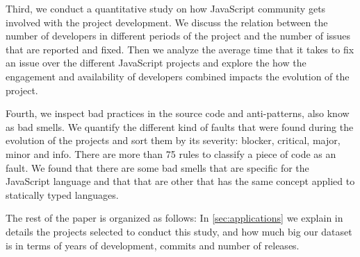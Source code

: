 Third, we conduct a quantitative study on how JavaScript community gets involved with the project development. We discuss the relation between the number of developers in different periods of the project and the number of issues that are reported and fixed. Then we analyze the average time that it takes to fix an issue over the different JavaScript projects and explore the how the engagement and availability of developers combined impacts the evolution of the project. 

Fourth, we inspect bad practices in the source code and anti-patterns, also know as bad smells. We quantify the different kind of faults that were found during the evolution of the projects and sort them by its severity: blocker, critical, major, minor and info. There are more than 75 rules to classify a piece of code as an fault. We found that there are some bad smells that are specific for the JavaScript language and that that are other that has the same concept applied to statically typed languages.

The rest of the paper is organized as follows: In \ref{sec:applications} we explain in details the projects selected to conduct this study, and how much big our dataset is in terms of years of development, commits and number of releases. 